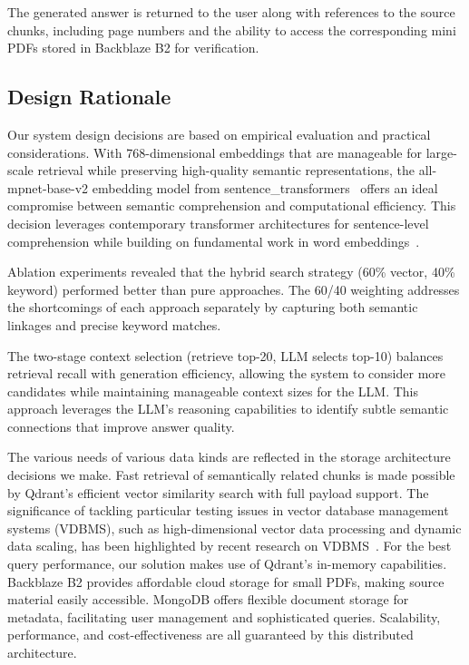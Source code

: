 \documentclass[runningheads]{llncs}
\begin{document}
The generated answer is returned to the user along with references to the source chunks, including page numbers and the ability to access the corresponding mini PDFs stored in Backblaze B2 for verification.

\subsection{Design Rationale}

Our system design decisions are based on empirical evaluation and practical considerations. With 768-dimensional embeddings that are manageable for large-scale retrieval while preserving high-quality semantic representations, the all-mpnet-base-v2 embedding model from sentence\_transformers~\cite{reimers2019sentence} offers an ideal compromise between semantic comprehension and computational efficiency. This decision leverages contemporary transformer architectures for sentence-level comprehension while building on fundamental work in word embeddings~\cite{mikolov2013word2vec,pennington2014glove}.

Ablation experiments revealed that the hybrid search strategy (60\% vector, 40\% keyword) performed better than pure approaches. The 60/40 weighting addresses the shortcomings of each approach separately by capturing both semantic linkages and precise keyword matches.

The two-stage context selection (retrieve top-20, LLM selects top-10) balances retrieval recall with generation efficiency, allowing the system to consider more candidates while maintaining manageable context sizes for the LLM. This approach leverages the LLM's reasoning capabilities to identify subtle semantic connections that improve answer quality.

The various needs of various data kinds are reflected in the storage architecture decisions we make. Fast retrieval of semantically related chunks is made possible by Qdrant's efficient vector similarity search with full payload support. The significance of tackling particular testing issues in vector database management systems (VDBMS), such as high-dimensional vector data processing and dynamic data scaling, has been highlighted by recent research on VDBMS~\cite{wang2025vectordb}. For the best query performance, our solution makes use of Qdrant's in-memory capabilities. Backblaze B2 provides affordable cloud storage for small PDFs, making source material easily accessible.
MongoDB offers flexible document storage for metadata, facilitating user management and sophisticated queries. Scalability, performance, and cost-effectiveness are all guaranteed by this distributed architecture.
\end{document}
